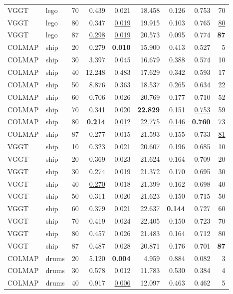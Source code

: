 \begin{table}[H]
\begin{tabular}{llrrrrrrr}
VGGT & lego & 70 & 0.439 & 0.021 & 18.458 & 0.126 & 0.753 & 70 \\
VGGT & lego & 80 & 0.347 & \underline{0.019} & 19.915 & 0.103 & 0.765 & \underline{80} \\
VGGT & lego & 87 & \underline{0.298} & \underline{0.019} & 20.573 & 0.095 & 0.774 & \textbf{87} \\
\midrule
COLMAP & ship & 20 & 0.279 & \textbf{0.010} & 15.900 & 0.413 & 0.527 & 5 \\
COLMAP & ship & 30 & 3.397 & 0.045 & 16.679 & 0.388 & 0.574 & 10 \\
COLMAP & ship & 40 & 12.248 & 0.483 & 17.629 & 0.342 & 0.593 & 17 \\
COLMAP & ship & 50 & 8.876 & 0.363 & 18.537 & 0.265 & 0.634 & 22 \\
COLMAP & ship & 60 & 0.706 & 0.026 & 20.769 & 0.177 & 0.710 & 52 \\
COLMAP & ship & 70 & 0.341 & 0.020 & \textbf{22.829} & 0.151 & \underline{0.753} & 59 \\
COLMAP & ship & 80 & \textbf{0.214} & \underline{0.012} & \underline{22.775} & \underline{0.146} & \textbf{0.760} & 73 \\
COLMAP & ship & 87 & 0.277 & 0.015 & 21.593 & 0.155 & 0.733 & \underline{81} \\
VGGT & ship & 10 & 0.323 & 0.021 & 20.607 & 0.196 & 0.685 & 10 \\
VGGT & ship & 20 & 0.369 & 0.023 & 21.624 & 0.164 & 0.709 & 20 \\
VGGT & ship & 30 & 0.274 & 0.019 & 21.372 & 0.170 & 0.695 & 30 \\
VGGT & ship & 40 & \underline{0.270} & 0.018 & 21.399 & 0.162 & 0.698 & 40 \\
VGGT & ship & 50 & 0.311 & 0.020 & 21.623 & 0.150 & 0.715 & 50 \\
VGGT & ship & 60 & 0.379 & 0.021 & 22.637 & \textbf{0.144} & 0.727 & 60 \\
VGGT & ship & 70 & 0.419 & 0.024 & 22.405 & 0.150 & 0.723 & 70 \\
VGGT & ship & 80 & 0.457 & 0.026 & 21.483 & 0.164 & 0.712 & 80 \\
VGGT & ship & 87 & 0.487 & 0.028 & 20.871 & 0.176 & 0.701 & \textbf{87} \\
\midrule
COLMAP & drums & 20 & 5.120 & \textbf{0.004} & 4.959 & 0.884 & 0.082 & 3 \\
COLMAP & drums & 30 & 0.578 & 0.012 & 11.783 & 0.530 & 0.384 & 4 \\
COLMAP & drums & 40 & 0.917 & \underline{0.006} & 12.097 & 0.463 & 0.462 & 5 \\

\end{tabular}
\end{table}
